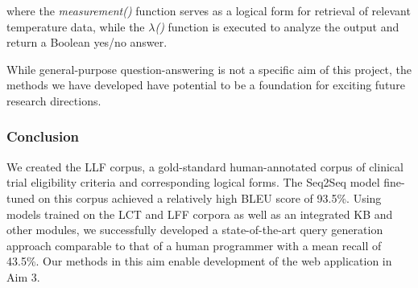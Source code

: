 \documentclass[../main.tex]{subfiles}
\begin{document}
\noindent where the \textit{measurement()} function serves as a logical form for retrieval of relevant temperature data, while the $\lambda$\textit{()} function is executed to analyze the output and return a Boolean yes/no answer.

While general-purpose question-answering is not a specific aim of this project, the methods we have developed have potential to be a foundation for exciting future research directions. 

\subsubsection{Conclusion}

We created the LLF corpus, a gold-standard human-annotated corpus of clinical trial eligibility criteria and corresponding logical forms. The Seq2Seq model fine-tuned on this corpus achieved a relatively high BLEU score of 93.5\%. Using models trained on the LCT and LFF corpora as well as an integrated KB and other modules, we successfully developed a state-of-the-art query generation approach comparable to that of a human programmer with a mean recall of 43.5\%. Our methods in this aim enable development of the web application in Aim 3.
\end{document}
